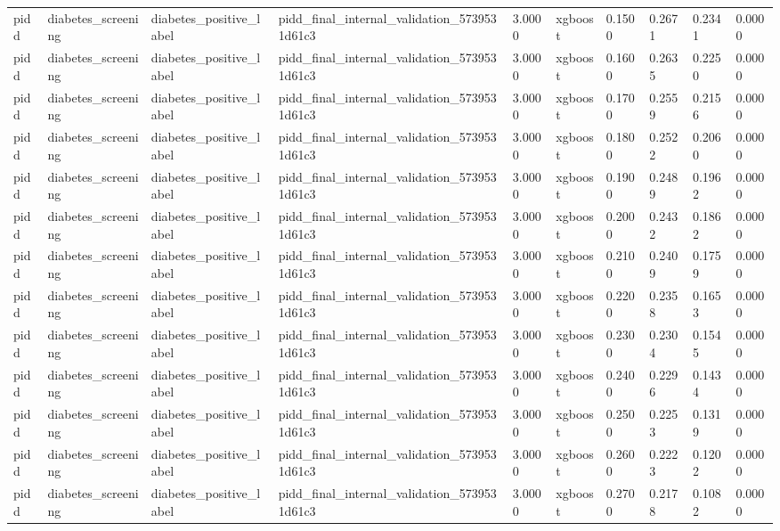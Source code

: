 \begin{tabular}{llllllllll}
pidd & diabetes\_screening & diabetes\_positive\_label & pidd\_final\_internal\_validation\_5739531d61c3 & 3.0000 & xgboost & 0.1500 & 0.2671 & 0.2341 & 0.0000 \\
pidd & diabetes\_screening & diabetes\_positive\_label & pidd\_final\_internal\_validation\_5739531d61c3 & 3.0000 & xgboost & 0.1600 & 0.2635 & 0.2250 & 0.0000 \\
pidd & diabetes\_screening & diabetes\_positive\_label & pidd\_final\_internal\_validation\_5739531d61c3 & 3.0000 & xgboost & 0.1700 & 0.2559 & 0.2156 & 0.0000 \\
pidd & diabetes\_screening & diabetes\_positive\_label & pidd\_final\_internal\_validation\_5739531d61c3 & 3.0000 & xgboost & 0.1800 & 0.2522 & 0.2060 & 0.0000 \\
pidd & diabetes\_screening & diabetes\_positive\_label & pidd\_final\_internal\_validation\_5739531d61c3 & 3.0000 & xgboost & 0.1900 & 0.2489 & 0.1962 & 0.0000 \\
pidd & diabetes\_screening & diabetes\_positive\_label & pidd\_final\_internal\_validation\_5739531d61c3 & 3.0000 & xgboost & 0.2000 & 0.2432 & 0.1862 & 0.0000 \\
pidd & diabetes\_screening & diabetes\_positive\_label & pidd\_final\_internal\_validation\_5739531d61c3 & 3.0000 & xgboost & 0.2100 & 0.2409 & 0.1759 & 0.0000 \\
pidd & diabetes\_screening & diabetes\_positive\_label & pidd\_final\_internal\_validation\_5739531d61c3 & 3.0000 & xgboost & 0.2200 & 0.2358 & 0.1653 & 0.0000 \\
pidd & diabetes\_screening & diabetes\_positive\_label & pidd\_final\_internal\_validation\_5739531d61c3 & 3.0000 & xgboost & 0.2300 & 0.2304 & 0.1545 & 0.0000 \\
pidd & diabetes\_screening & diabetes\_positive\_label & pidd\_final\_internal\_validation\_5739531d61c3 & 3.0000 & xgboost & 0.2400 & 0.2296 & 0.1434 & 0.0000 \\
pidd & diabetes\_screening & diabetes\_positive\_label & pidd\_final\_internal\_validation\_5739531d61c3 & 3.0000 & xgboost & 0.2500 & 0.2253 & 0.1319 & 0.0000 \\
pidd & diabetes\_screening & diabetes\_positive\_label & pidd\_final\_internal\_validation\_5739531d61c3 & 3.0000 & xgboost & 0.2600 & 0.2223 & 0.1202 & 0.0000 \\
pidd & diabetes\_screening & diabetes\_positive\_label & pidd\_final\_internal\_validation\_5739531d61c3 & 3.0000 & xgboost & 0.2700 & 0.2178 & 0.1082 & 0.0000 \\

\end{tabular}
